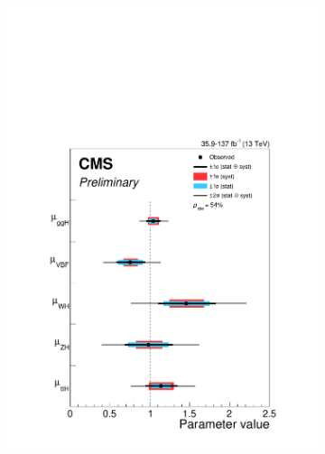 \begin{figure}[htbp]
  \centering
  \begin{subfigure}[htbp]{0.48\textwidth}
    \centering
    \includegraphics[width=\textwidth]{figures_and_tables/theory/signal_strength_modifier_prod.pdf}
    \caption{ }
    \label{signal_strength_modifier_prod}
  \end{subfigure}
  \hfill
  \begin{subfigure}[htbp]{0.48\textwidth}
    \centering

\end{subfigure}
\end{figure}

